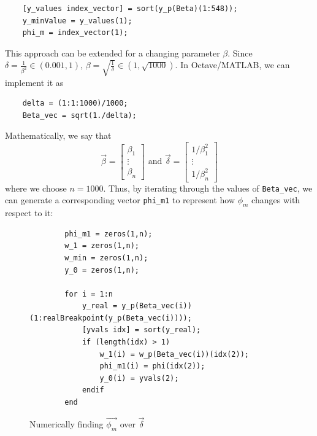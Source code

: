 \begin{verbatim}
    [y_values index_vector] = sort(y_p(Beta)(1:548));
    y_minValue = y_values(1);
    phi_m = index_vector(1);
\end{verbatim}

This approach can be extended for a changing parameter $\beta$. 
Since $\delta=\frac{1}{\beta^2}\in (0.001,1)$, $\beta=\sqrt{\frac{1}{\delta}}\in (1,\sqrt{1000})$.
In Octave/MATLAB, we can implement it as

\begin{verbatim}
    delta = (1:1:1000)/1000;
    Beta_vec = sqrt(1./delta);
\end{verbatim}

Mathematically, we say that 
\begin{equation}
\vec\beta=\begin{bmatrix}\beta_1\\\vdots\\\beta_n\end{bmatrix}\text{ and }\vec{\delta}=\begin{bmatrix}1/\beta_1^2\\\vdots\\1/\beta_n^2\end{bmatrix}
\label{paravectors}
\end{equation}
where we choose $n=1000$.
Thus, by iterating through the values of \verb|Beta_vec|, we can generate a corresponding vector \verb|phi_m1| to represent how $\phi_m$ changes with respect to it:

\begin{figure}[H]
    \begin{verbatim}
        phi_m1 = zeros(1,n);
        w_1 = zeros(1,n);
        w_min = zeros(1,n);
        y_0 = zeros(1,n);
    
        for i = 1:n
            y_real = y_p(Beta_vec(i))(1:realBreakpoint(y_p(Beta_vec(i))));
            [yvals idx] = sort(y_real);
            if (length(idx) > 1)
                w_1(i) = w_p(Beta_vec(i))(idx(2));
                phi_m1(i) = phi(idx(2));
                y_0(i) = yvals(2);
            endif
        end
    \end{verbatim}
    \caption{Numerically finding $\vec{\phi_m}$ over $\vec{\delta}$}\label{loop1}
\end{figure}

